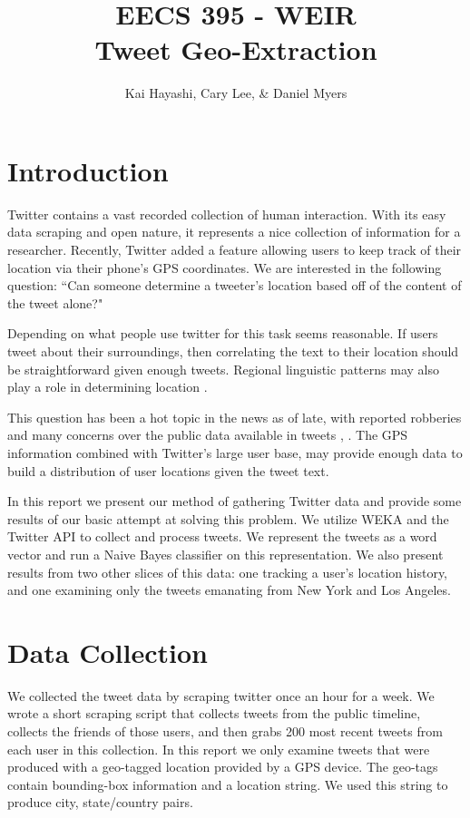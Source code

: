 \documentclass[12pt]{article}
\title{EECS 395 - WEIR \\ Tweet Geo-Extraction}
\author{Kai Hayashi, Cary Lee, \& Daniel Myers}
\date{}                                           %
\begin{document}
\maketitle
\section*{Introduction}
Twitter contains a vast recorded collection of human interaction. With its easy data scraping and open nature, it represents a nice collection of information for a researcher. Recently, Twitter added a feature allowing users to keep track of their location via their phone's GPS coordinates. We are interested in the following question: ``Can someone determine a tweeter's location based off of the content of the tweet alone?" 

Depending on what people use twitter for this task seems reasonable. If users tweet about their surroundings, then correlating the text to their location should be straightforward given enough tweets. Regional linguistic patterns may also play a role in determining location \cite{Zcheng}.

This question has been a hot topic in the news as of late, with reported robberies and many concerns over the public data available in tweets \cite{twrob}, \cite{twpriv}. The GPS information combined with Twitter's large user base, may provide enough data to build a distribution of user locations given the tweet text. 

In this report we present our method of gathering Twitter data and provide some results of our basic attempt at solving this problem. We utilize WEKA and the Twitter API to collect and process tweets. We represent the tweets as a word vector and run a Naive Bayes classifier on this representation. We also present results from two other slices of this data: one tracking a user's location history, and one examining only the tweets emanating from New York and Los Angeles. 

\section*{Data Collection}
We collected the tweet data by scraping twitter once an hour for a week. We wrote a short scraping script that collects tweets from the public timeline, collects the friends of those users, and then grabs 200 most recent tweets from each user in this collection. In this report we only examine tweets that were produced with a geo-tagged location provided by a GPS device. The geo-tags contain bounding-box information and a location string. We used this string to produce city, state/country pairs. 
\end{document}
